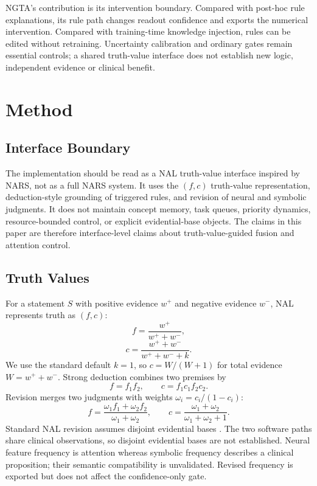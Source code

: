 \documentclass{article}
\begin{document}
NGTA's contribution is its intervention boundary. Compared with post-hoc rule explanations, its rule path changes readout confidence and exports the numerical intervention. Compared with training-time knowledge injection, rules can be edited without retraining. Uncertainty calibration and ordinary gates remain essential controls; a shared truth-value interface does not establish new logic, independent evidence or clinical benefit.

\section{Method}
\label{sec:method}

\subsection{Interface Boundary}

The implementation should be read as a NAL truth-value interface inspired by NARS, not as a full NARS system. It uses the $(f,c)$ truth-value representation, deduction-style grounding of triggered rules, and revision of neural and symbolic judgments. It does not maintain concept memory, task queues, priority dynamics, resource-bounded control, or explicit evidential-base objects. The claims in this paper are therefore interface-level claims about truth-value-guided fusion and attention control.

\subsection{Truth Values}

For a statement $S$ with positive evidence $w^+$ and negative evidence $w^-$, NAL represents truth as $(f,c)$:
\begin{equation}
f=\frac{w^+}{w^+ + w^-},
\label{eq:frequency}
\end{equation}
\begin{equation}
c=\frac{w^+ + w^-}{w^+ + w^- + k}.
\label{eq:confidence}
\end{equation}
We use the standard default $k=1$, so $c=W/(W+1)$ for total evidence $W=w^+ + w^-$. Strong deduction combines two premises by
\begin{equation}
f=f_1f_2,\qquad c=f_1c_1f_2c_2.
\label{eq:deduction}
\end{equation}
Revision merges two judgments with weights $\omega_i=c_i/(1-c_i)$:
\begin{equation}
f=\frac{\omega_1 f_1+\omega_2 f_2}{\omega_1+\omega_2},\qquad
c=\frac{\omega_1+\omega_2}{\omega_1+\omega_2+1}.
\label{eq:revision}
\end{equation}
Standard NAL revision assumes disjoint evidential bases \citep{wang2025}. The two software paths share clinical observations, so disjoint evidential bases are not established. Neural feature frequency is attention whereas symbolic frequency describes a clinical proposition; their semantic compatibility is unvalidated. Revised frequency is exported but does not affect the confidence-only gate.
\end{document}
